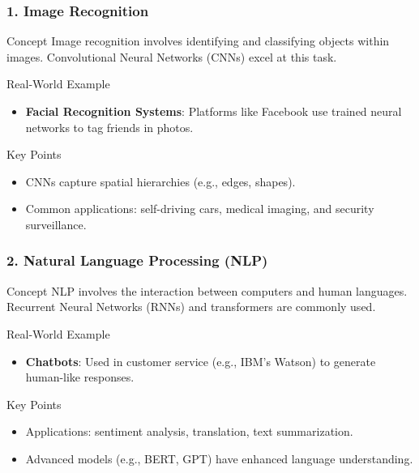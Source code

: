 \documentclass[aspectratio=169]{beamer}
\begin{document}
\begin{frame}
  \frametitle{1. Image Recognition}
  
  \begin{block}{Concept}
    Image recognition involves identifying and classifying objects within images. Convolutional Neural Networks (CNNs) excel at this task.
  \end{block}

  \begin{block}{Real-World Example}
    \begin{itemize}
      \item \textbf{Facial Recognition Systems}: Platforms like Facebook use trained neural networks to tag friends in photos.
    \end{itemize}
  \end{block}

  \begin{block}{Key Points}
    \begin{itemize}
      \item CNNs capture spatial hierarchies (e.g., edges, shapes).
      \item Common applications: self-driving cars, medical imaging, and security surveillance.
    \end{itemize}
  \end{block}
\end{frame}

\begin{frame}
  \frametitle{2. Natural Language Processing (NLP)}

  \begin{block}{Concept}
    NLP involves the interaction between computers and human languages. Recurrent Neural Networks (RNNs) and transformers are commonly used.
  \end{block}

  \begin{block}{Real-World Example}
    \begin{itemize}
      \item \textbf{Chatbots}: Used in customer service (e.g., IBM's Watson) to generate human-like responses.
    \end{itemize}
  \end{block}

  \begin{block}{Key Points}
    \begin{itemize}
      \item Applications: sentiment analysis, translation, text summarization.
      \item Advanced models (e.g., BERT, GPT) have enhanced language understanding.
    \end{itemize}
  \end{block}
\end{frame}
\end{document}
